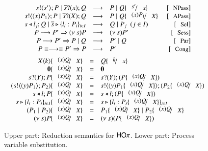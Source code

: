 \begin{figure}
\[
	\begin{array}{c}
		\begin{array}{rclr}
			\bout{s}{s'} P \Par \binp{\dual{s}}{x} Q & \red & P \Par Q \subst{s'}{x} & \orule{NPass} \\
			\bout{s}{\abs{x}{P_1}} P \Par \binp{\dual{s}}{\X} Q & \red & P \Par Q \subst{\abs{x}{P_1}}{\X}\ & \orule{APass} \\
			\bsel{s}{l_j} Q \Par \bbra{\dual{s}}{l_i : P_i}_{i \in I} & \red & Q \Par P_j ~~(j \in I)~~  & \orule{Sel}\\
			P \red P' \Rightarrow \news{s} P & \red & \news{s} P'  & \orule{Sess} \\
			P \red P' \Rightarrow   P \Par Q & \red &  P' \Par Q  & \orule{Par} \\
			P \scong \red \scong P' \Rightarrow P & \red & P' & \orule{Cong}
		\end{array}
		\vspace{2mm} \\
		\begin{array}{rcl}
			\appl{X}{k} \subst{\abs{x}{Q}}{\X} & = & Q \subst{k}{x} \\
			\inact \subst{\abs{x}{Q}}{\X} & = &  \inact
			\\
			\binp{s}{\Y} P \subst{\abs{x}{Q}}{\X} & = &  \binp{s}{\Y} (P \subst{\abs{x}{Q}}{\X})
			\\
			(\bout{s}{\abs{y}{P_1}} P_2) \subst{\abs{x}{Q}}{\X} & = & \bout{s}{\abs{y}{P_1 \subst{\abs{x}{Q}}{\X}}} (P_2 \subst{\abs{x}{Q}}{\X})
			\\
			\bsel{s}{l} P \subst{\abs{x}{Q}}{\X} & = & \bsel{s}{l} (P \subst{\abs{x}{Q}}{\X})
			\\
			\bbra{s}{l_i : P_i}_{i \in I} \subst{\abs{x}{Q}}{\X} & = & \bbra{s}{l_i : P_i \subst{\abs{x}{Q}}{\X}}_{i \in I}
			\\
			(P_1 \Par P_2) \subst{\abs{x}{Q}}{\X} & = & P_1 \subst{\abs{x}{Q}}{\X} \Par P_2 \subst{\abs{x}{Q}}{\X}
			\\
			\news{s} P \subst{\abs{x}{Q}}{\X} & = & \news{s} (P \subst{\abs{x}{Q}}{\X})
		\end{array}
	\end{array}
\]
	\caption{Upper part: Reduction semantics for $\mathsf{HO}\pi$. Lower part: Process variable substitution. \label{fig:reduction}}
\end{figure}
